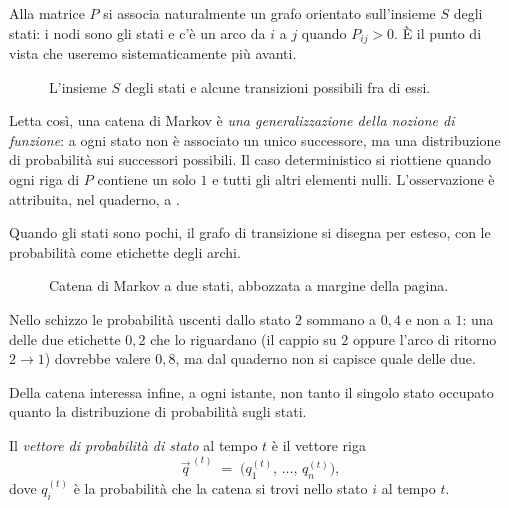 \medskip

Alla matrice $P$ si associa naturalmente un grafo orientato sull'insieme $S$ degli
stati: i nodi sono gli stati e c'è un arco da $i$ a $j$ quando $P_{ij} > 0$. È il punto
di vista che useremo sistematicamente più avanti.

\begin{figure}[H]
  \centering
  
  \caption{L'insieme $S$ degli stati e alcune transizioni possibili fra di essi.}
  \label{fig:p73-spazio-stati}
\end{figure}

Letta così, una catena di Markov è \emph{una generalizzazione della nozione di
funzione}: a ogni stato non è associato un unico successore, ma una distribuzione di
probabilità sui successori possibili. Il caso deterministico si riottiene quando ogni
riga di $P$ contiene un solo $1$ e tutti gli altri elementi nulli.
L'osservazione è attribuita, nel quaderno, a .

Quando gli stati sono pochi, il grafo di transizione si disegna per esteso, con le
probabilità come etichette degli archi.

\begin{figure}[H]
  \centering
  
  \caption{Catena di Markov a due stati, abbozzata a margine della pagina.}
  \label{fig:p75-mc-due-stati}
\end{figure}

\begin{dubbio}
  Nello schizzo le probabilità uscenti dallo stato $2$ sommano a $0{,}4$ e non a $1$:
  una delle due etichette $0{,}2$ che lo riguardano (il cappio su $2$ oppure l'arco di
  ritorno $2 \to 1$) dovrebbe valere $0{,}8$, ma dal quaderno non si capisce quale
  delle due.
\end{dubbio}

\medskip

Della catena interessa infine, a ogni istante, non tanto il singolo stato occupato
quanto la distribuzione di probabilità sugli stati.

\begin{definizione}\label{def:state-probability-vector}
  Il \emph{vettore di probabilità di stato} al tempo $t$ è il vettore riga
  \[
    \vec{q}^{\,(t)} \;=\; \bigl(q^{(t)}_{1},\, \dots,\, q^{(t)}_{n}\bigr),
  \]
  dove $q^{(t)}_{i}$ è la probabilità che la catena si trovi nello stato $i$ al tempo $t$.
\end{definizione}


